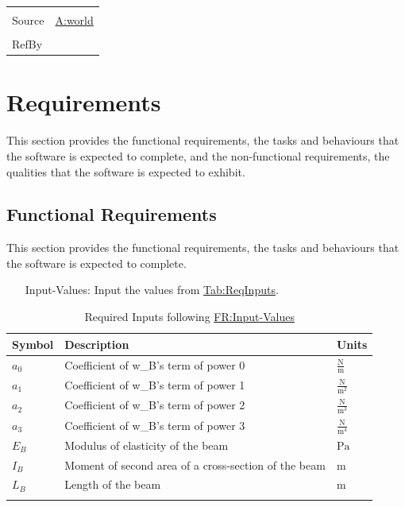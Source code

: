 \documentclass[12pt]{article}
\begin{document}
\begin{minipage}{\textwidth}
\begin{tabular}{>{\raggedright}p{}>{\raggedright\arraybackslash}p{}}
\\ \midrule \\
Source & \hyperref[world]{A:world}
         
\\ \midrule \\
RefBy & 
\\ \bottomrule
\end{tabular}
\end{minipage}

\section{Requirements}
\label{Sec:Requirements}
This section provides the functional requirements, the tasks and behaviours that the software is expected to complete, and the non-functional requirements, the qualities that the software is expected to exhibit.

\subsection{Functional Requirements}
\label{Sec:FRs}
This section provides the functional requirements, the tasks and behaviours that the software is expected to complete.

\begin{itemize}
\item[Input-Values:\phantomsection\label{inputValues}]{Input the values from \hyperref[Table:ReqInputs]{Tab:ReqInputs}.}
\end{itemize}
\begin{longtabu}{l X[l] l}
\toprule
\textbf{Symbol} & \textbf{Description} & \textbf{Units}
\\
\midrule
\endhead
${a_{\text{0}}}$ & Coefficient of w\_B's term of power 0 & $\frac{\text{N}}{\text{m}}$
\\
${a_{\text{1}}}$ & Coefficient of w\_B's term of power 1 & $\frac{\text{N}}{\text{m}^{2}}$
\\
${a_{\text{2}}}$ & Coefficient of w\_B's term of power 2 & $\frac{\text{N}}{\text{m}^{3}}$
\\
${a_{\text{3}}}$ & Coefficient of w\_B's term of power 3 & $\frac{\text{N}}{\text{m}^{4}}$
\\
${E_{B}}$ & Modulus of elasticity of the beam & ${\text{Pa}}$
\\
${I_{B}}$ & Moment of second area of a cross-section of the beam & ${\text{m}}$
\\
${L_{B}}$ & Length of the beam & ${\text{m}}$
\\
\bottomrule
\caption{Required Inputs following \hyperref[inputValues]{FR:Input-Values}}
\label{Table:ReqInputs}
\end{longtabu}
\end{document}
